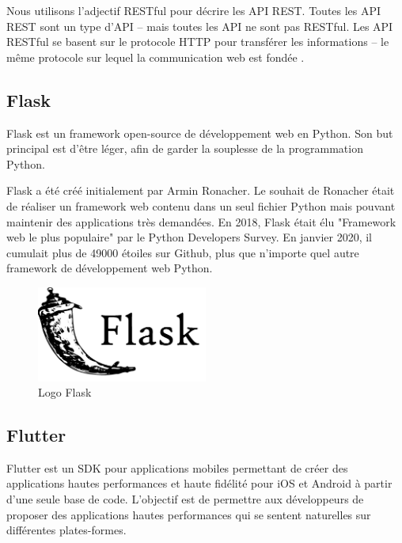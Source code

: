 Nous utilisons l’adjectif RESTful pour décrire les API REST. Toutes les API REST sont un type d’API – mais toutes les API ne sont pas RESTful. Les API RESTful se basent sur le protocole HTTP pour transférer les informations – le même protocole sur lequel la communication web est fondée \cite{IdentifiezAvantagesAPI}.


\subsection{Flask}
Flask \cite{WelcomeFlaskFlask} est un framework open-source de développement web en Python. Son but principal est d'être léger, afin de garder la souplesse de la programmation Python.

Flask a été créé initialement par Armin Ronacher. Le souhait de Ronacher était de réaliser un framework web contenu dans un seul fichier Python mais pouvant maintenir des applications très demandées.
En 2018, Flask était élu "Framework web le plus populaire" par le Python Developers Survey. En janvier 2020, il cumulait plus de 49000 étoiles sur Github, plus que n'importe quel autre framework de développement web Python\cite{FlaskFramework2020}.
\begin{figure}[h!]
    \center
    \includegraphics[width=0.50\textwidth]{Images/chapter3/flask.png}
    \caption{Logo Flask}
    \label{fig:Technologies}
\end{figure}

\subsection{Flutter}
Flutter \cite{FlutterBeautifulNative} est un SDK pour applications mobiles permettant de créer des applications hautes performances et haute fidélité pour iOS et Android à partir d’une seule base de code.
L’objectif est de permettre aux développeurs de proposer des applications hautes performances qui se sentent naturelles sur différentes plates-formes.

